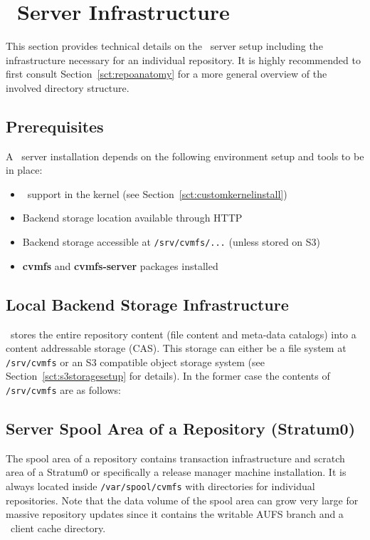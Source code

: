 \chapter{\cvmfs\ Server Infrastructure}
\label{apx:serverinfrastructure}

This section provides technical details on the \cvmfs\ server setup including the infrastructure necessary for an individual repository.
It is highly recommended to first consult Section~\ref{sct:repoanatomy} for a more general overview of the involved directory structure.

\section{Prerequisites}
A \cvmfs\ server installation depends on the following environment setup and tools to be in place:
\begin{itemize}
\item \aufs\ support in the kernel (see Section~\ref{sct:customkernelinstall})
\item Backend storage location available through HTTP
\item Backend storage accessible at \texttt{/srv/cvmfs/...} (unless stored on S3)
\item \textbf{cvmfs} and \textbf{cvmfs-server} packages installed
\end{itemize}
\pagebreak

\section{Local Backend Storage Infrastructure}
\cvmfs\ stores the entire repository content (file content and meta-data catalogs) into a content addressable storage (CAS).
This storage can either be a file system at \texttt{/srv/cvmfs} or an S3 compatible object storage system (see Section~\ref{sct:s3storagesetup} for details).
In the former case the contents of \texttt{/srv/cvmfs} are as follows:

\pagebreak

\section{Server Spool Area of a Repository (Stratum0)}
The spool area of a repository contains transaction infrastructure and scratch area of a Stratum0 or specifically a release manager machine installation.
It is always located inside \texttt{/var/spool/cvmfs} with directories for individual repositories.
Note that the data volume of the spool area can grow very large for massive repository updates since it contains the writable AUFS branch and a \cvmfs\ client cache directory.

